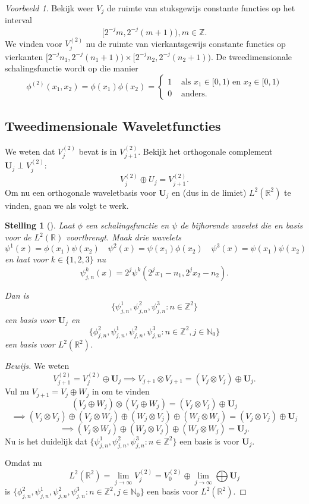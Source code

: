 \documentclass[11pt]{report}
\newcommand{\R}{\mathbb{R}}
\newcommand{\N}{\mathbb{N}}
\newcommand{\Z}{\mathbb{Z}}
\theoremstyle{plain}
\newtheorem*{stelling}{Stelling}
\theoremstyle{remark}
\newtheorem*{voorbeeld}{Voorbeeld}
\begin{document}
\begin{voorbeeld}
Bekijk weer $V_j$ de ruimte van stuksgewijs constante functies op het interval 
\[
 [2^{-j} m, 2^{-j}(m+1) ), m \in \Z.
\] 
We vinden voor $V_j^{(2)}$ nu de ruimte van vierkantsgewijs constante functies op vierkanten $[2^{-j}n_1, 2^{-j}(n_1+1)) \times [2^{-j}n_2, 2^{-j}(n_2+1))$. De tweedimensionale schalingsfunctie wordt op die manier
\[
	\phi^{(2)}(x_1,x_2) = \phi(x_1)\phi(x_2) = \begin{cases} 1 & \text{ als } x_1 \in [0,1)\text{ en }x_2 \in [0,1) \\ 0 & \text{ anders.} \end{cases}
\]
\end{voorbeeld}

\subsection{Tweedimensionale Waveletfuncties}
We weten dat $V_j^{(2)}$ bevat is in $V_{j+1}^{(2)}$. Bekijk het orthogonale complement $\boldsymbol{U}_j \perp V_j^{(2)}$:
\[
	V_j^{(2)} \oplus U_j = V_{j+1}^{(2)}.
\]
Om nu een orthogonale waveletbasis voor $\boldsymbol{U}_j$ en (dus in de limiet) $L^2(\R^2)$ te vinden, gaan we als volgt te werk.
\begin{stelling}[{\cite[T7.24]{mallat}}]
Laat $\phi$ een schalingsfunctie en $\psi$ de bijhorende wavelet die en basis voor de $L^2(\R)$ voortbrengt. Maak drie wavelets
\[
	\psi^1(x) = \phi(x_1)\psi(x_2) \quad \psi^2(x) = \psi(x_1) \phi(x_2) \quad \psi^3(x) = \psi(x_1)\psi(x_2)
\]
en laat voor $k \in \{1,2,3\}$ nu
\[
	\psi^k_{j,n}(x) = 2^j \psi^k\left( 2^jx_1 - n_1, 2^j x_2 - n_2 \right).
\]

Dan is 
\[
	\{ \psi^1_{j,n}, \psi^2_{j,n}, \psi^3_{j,n}: n \in \Z^2 \}
\] een basis voor $\boldsymbol{U}_j$ 
en 
\[
	\{ \phi^2_{j, n}, \psi^1_{j,n}, \psi^2_{j,n}, \psi^3_{j,n}: n \in \Z^2, j \in \N_0 \}
\] een basis voor $L^2(\R^2)$.
\end{stelling}
\begin{proof}[Bewijs]
We weten
\[
	V_{j+1}^{(2)} = V_j^{(2)} \oplus \boldsymbol{U}_j \implies V_{j+1} \otimes V_{j+1} = ( V_j \otimes V_j ) \oplus \boldsymbol{U}_j.
\]
Vul nu $V_{j+1} = V_j \oplus W_j$ in om te vinden
\[
	( V_j \oplus W_j ) \otimes (V_j \oplus W_j ) = (V_j \otimes V_j) \oplus \boldsymbol{U}_j
\]
\[
	\implies (V_j \otimes V_j) \oplus (V_j \otimes W_j) \oplus (W_j \otimes V_j) \oplus (W_j \otimes W_j) = (V_j \otimes V_j) \oplus \boldsymbol{U}_j
\]
\[
	\implies (V_j \otimes W_j) \oplus (W_j \otimes V_j) \oplus (W_j \otimes W_j) = \boldsymbol{U}_j.
\]
Nu is het duidelijk dat $\{ \psi^1_{j,n}, \psi^2_{j,n}, \psi^3_{j,n}: n \in \Z^2 \}$ een basis is voor $\boldsymbol{U}_j$. 

Omdat nu
\[
	L^2(\R^2) = \lim_{j \to \infty} V_j^{(2)} = V_0^{(2)} \oplus \lim_{j \to \infty} \bigoplus \boldsymbol{U}_j
\]
is $\{  \phi^2_{j, n}, \psi^1_{j,n}, \psi^2_{j,n}, \psi^3_{j,n}: n \in \Z^2, j \in \N_0 \}$ een basis voor $L^2(\R^2)$.
\end{proof}
\end{document}
